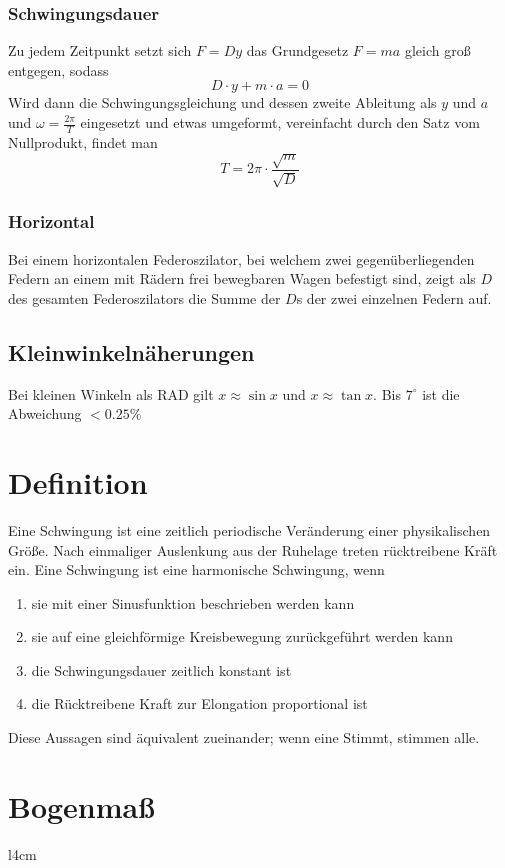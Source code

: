 \documentclass{article}
\begin{document}
\subsubsection*{Schwingungsdauer}
Zu jedem Zeitpunkt setzt sich $F=Dy$ das Grundgesetz $F=ma$ gleich groß entgegen, sodass
\[
 D \cdot y + m \cdot a = 0
\]
Wird dann die Schwingungsgleichung und dessen zweite Ableitung als $y$ und $a$ und $\omega = \frac{2\pi}{T}$ eingesetzt und etwas umgeformt, vereinfacht durch den Satz vom Nullprodukt, findet man
\[
 T = 2\pi \cdot \frac{\sqrt{m}}{\sqrt{D}} 
\]  
 
\subsubsection*{Horizontal}
Bei einem horizontalen Federoszilator, bei welchem zwei gegenüberliegenden Federn an einem mit Rädern frei bewegbaren Wagen befestigt sind, zeigt als $D$ des gesamten Federoszilators die Summe der $D$s der zwei einzelnen Federn auf.  
 
\subsection*{Kleinwinkelnäherungen}
Bei kleinen Winkeln als RAD gilt $x \approx \sin x$ und $x \approx \tan x$. Bis $7^\circ$ ist die Abweichung $< 0.25\%$
 
\section{Definition}
Eine Schwingung ist eine zeitlich periodische Veränderung einer physikalischen Größe. Nach einmaliger Auslenkung aus der Ruhelage treten rücktreibene Kräft ein. \newline
Eine Schwingung ist eine harmonische Schwingung, wenn
\begin{enumerate}
 \item sie mit einer Sinusfunktion beschrieben werden kann
 \item sie auf eine gleichförmige Kreisbewegung zurückgeführt werden kann
 \item die Schwingungsdauer zeitlich konstant ist
 \item die Rücktreibene Kraft zur Elongation proportional ist 
\end{enumerate}  
Diese Aussagen sind äquivalent zueinander; wenn eine Stimmt, stimmen alle. 
 
\section{Bogenmaß} 
\begin{wrapfigure}{l}{4cm}
\end{wrapfigure}  
 
\end{document}
